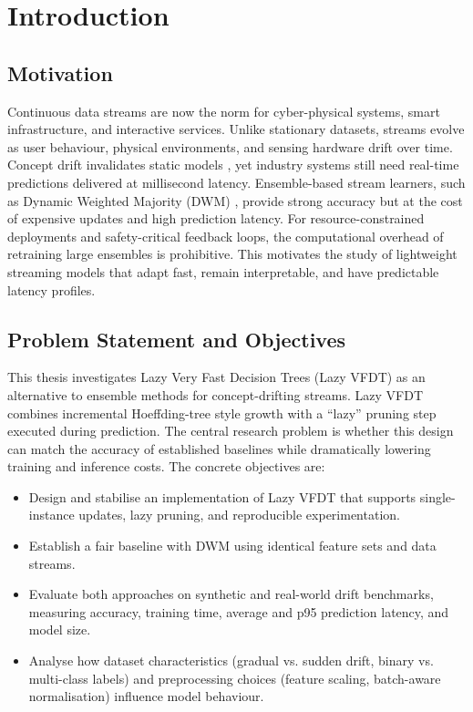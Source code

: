 \cleardoublepage
\chapter{Introduction}
\label{chap:introduction}

\section{Motivation}
Continuous data streams are now the norm for cyber-physical systems, smart infrastructure, and interactive services.  Unlike stationary datasets, streams evolve as user behaviour, physical environments, and sensing hardware drift over time.  Concept drift invalidates static models \cite{gama2014survey}, yet industry systems still need real-time predictions delivered at millisecond latency.  Ensemble-based stream learners, such as Dynamic Weighted Majority (DWM) \cite{kolter2007dwm}, provide strong accuracy but at the cost of expensive updates and high prediction latency.  For resource-constrained deployments and safety-critical feedback loops, the computational overhead of retraining large ensembles is prohibitive.  This motivates the study of lightweight streaming models that adapt fast, remain interpretable, and have predictable latency profiles.

\section{Problem Statement and Objectives}
This thesis investigates Lazy Very Fast Decision Trees (Lazy VFDT) as an alternative to ensemble methods for concept-drifting streams.  Lazy VFDT combines incremental Hoeffding-tree style growth \cite{domingos2000vfdt} with a ``lazy'' pruning step executed during prediction.  The central research problem is whether this design can match the accuracy of established baselines while dramatically lowering training and inference costs.  The concrete objectives are:
\begin{itemize}
    \item Design and stabilise an implementation of Lazy VFDT that supports single-instance updates, lazy pruning, and reproducible experimentation.
    \item Establish a fair baseline with DWM using identical feature sets and data streams.
    \item Evaluate both approaches on synthetic and real-world drift benchmarks, measuring accuracy, training time, average and p95 prediction latency, and model size.
    \item Analyse how dataset characteristics (gradual vs. sudden drift, binary vs. multi-class labels) and preprocessing choices (feature scaling, batch-aware normalisation) influence model behaviour.
\end{itemize}

